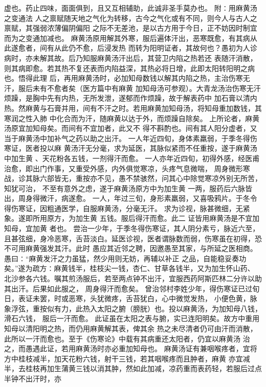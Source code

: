 \documentclass[a4paper,12pt,UTF8,twoside]{ctexbook}
\begin{document}
虚也。药止四味，面面俱到，且又互相辅助，此诚非圣手莫办也。 
附∶用麻黄汤之变通法 
人之禀赋随天地之气化为转移，古今之气化或有不同，则今人与古人之禀赋，其强弱浓薄偏阴偏阳 
之际不无差池，是以古方用于今日，正不妨因时制宜而为之变通加减也。 
麻黄汤原用解其外寒，服后遍体汗出，恶寒既愈，有其病从此遂愈者，间有从此仍不愈，后浸发热 
而转为阳明证者，其故何也？愚初为人诊病时，亦未解其故。后乃知服麻黄汤汗出后，其营卫内陷之热若还 
表随汗消散，则其病即愈。若其热不复还表而内陷益深，其热必将日增，此即太阳转阳明之病也。悟得此理 
后，再用麻黄汤时，必加知母数钱以解其内陷之热，主治伤寒无汗，服后未有不愈者矣（医方篇中有麻黄 
加知母汤可参观）。大青龙汤治伤寒无汗烦躁，是胸中先有内热，无所发泄，遂郁而作烦躁，故于解表药中 
加石膏以清内热。然麻黄与石膏并用，间有不汗之时。若用麻黄加知母汤，将知母重加数钱，其寒润之性入肺 
中化合而为汗，随麻黄以达于外，而烦躁自除矣。 
上所论者，麻黄汤原宜加知母矣。而间有不宜加者，此又不 
得不斟酌也。间有其人阳分虚者，又当于麻黄汤中加补气之药以助之出汗。 
一人年近四旬，身体素羸弱，于季冬得伤寒证，医者投以麻 
黄汤汗无分毫，求为延医，其脉似紧而不任重按，遂于麻黄汤中加生黄 、天花粉各五钱，一剂得汗而愈。 
一人亦年近四旬，初得外感，经医甫治愈，即出门作事，又重受外感，内外俱觉寒凉，头疼气息微喘， 
周身微形寒战，诊其脉六部皆无，重按亦不见，愚不禁骇然，问其心中除觉寒凉外别无所苦，知犹可治， 
不至有意外之虑，遂于麻黄汤原方中为加生黄 一两，服药后六脉皆出，周身得微汗，病遂愈。 
一人，年过三旬，身形素羸弱，又喜吸鸦片。于冬令得伤寒证，因粗通医学，自服麻黄汤，分毫无汗。 
求为诊视，脉甚微细，无紧象。遂即所用原方，为加生黄 五钱。服后得汗而愈。此二 
证皆用麻黄汤是不宜加知母，宜加黄 者也。 
尝治一少年，于季冬得伤寒证，其人阴分素亏，脉近六至， 
且甚弦细，身冷恶寒，舌苔淡白。延医诊视，医者谓脉数而弱，伤寒虽在初得，恐不可用麻黄强发其汗。此时 
愚应其近邻之聘，因邀愚至其家，与所延之医相商。愚曰∶“麻黄发汗之力虽猛，然少用则无妨，再辅以补正 
之品，自能稳妥奏功矣。”遂为疏方∶麻黄钱半，桂枝尖一钱，杏仁、甘草各钱半，又为加生怀山药、 
北沙参各六钱。嘱其煎汤服后，若至两点钟不出汗，宜服西药阿斯匹林二分许以助其出汗。后果如此服之， 
周身得汗而愈矣。 
曾治邻村李姓少年，得伤寒证已过旬日，表证未罢，时或恶寒，头犹微疼，舌苔犹白，心中微觉发热， 
小便色黄，脉象浮弦，重按似有力，此热入太阳之腑（膀胱）也。投以麻黄汤，为加知母八钱，滑石六钱， 
服后一汗而愈。 
此证虽在太阳之表与腑，实已连阳明矣。故方中重用知母以清阳明之热，而仍用麻黄解其表，俾其余 
热之未尽清者仍可由汗而消散，此所以一汗而愈也。至于《伤寒论》中载有其病重还太阳者，仍宜以麻黄汤 
治之，而愚遇此证，若用麻黄汤时亦必重加知母也。 
麻黄汤证有兼咽喉疼者，宜将方中桂枝减半，加天花粉六钱，射干三钱，若其咽喉疼而且肿者，麻黄 
亦宜减半，去桂枝再加生蒲黄三钱以消其肿，然如此加减，凉药重而表药轻，若服后过点半钟不出汗时，亦 
\end{document}
